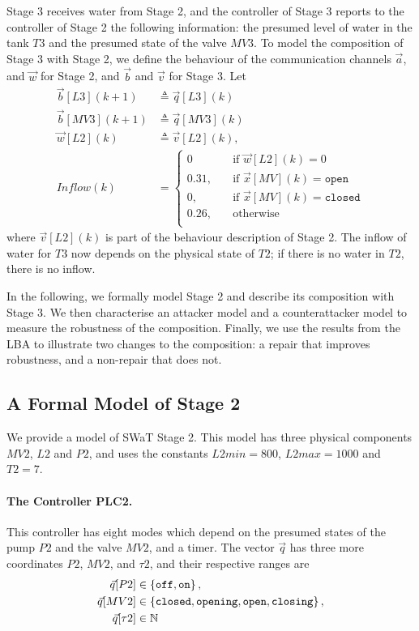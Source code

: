 {{Stage 3 receives water from Stage 2, and the controller of Stage 3 reports to the controller of Stage 2 the following information: the presumed level of water in the tank $T3$ and the presumed state of the valve $MV3$. To model the composition of Stage 3 with Stage 2, we define the behaviour of the communication channels $\vec{a}$, and $\vec{w}$ for Stage 2, and $\vec{b}$ and $\vec{v}$ for Stage 3. Let  
\begin{align}
  \vec{b}[L3](k+1)&\triangleq \vec{q}[L3](k)\\
  \vec{b}[MV3](k+1)&\triangleq \vec{q}[MV3](k)\\
  \vec{w}[L2](k)&\triangleq \vec{v}[L2](k),\\
  Inflow(k)&=\begin{cases}
    0 & \quad \text{if $\vec{w}[L2](k)=0$}\\
    0.31,&\quad \text{if $\vec{x}[MV](k)=\texttt{open}$}\\
    0,&\quad \text{if $\vec{x}[MV](k)=\texttt{closed}$}\\
    0.26,&\quad \text{otherwise}\\
  \end{cases}
\end{align}
where $\vec{v}[L2](k)$ is part of the behaviour description of Stage 2. The inflow of water for $T3$ now depends on the physical state of $T2$; if there is no water in $T2$, there is no inflow.

In the following, we formally model Stage 2 and describe its composition with Stage 3. We then characterise an attacker model and a counterattacker model to measure the robustness of the composition. Finally, we use the results from the LBA to illustrate two changes to the composition: a repair that improves robustness, and a non-repair that does not.

\subsection{A Formal Model of Stage 2}
We provide a model of SWaT Stage 2. This model has three physical components $MV2$, $L2$ and $P2$, and uses the constants $L2min=800$, $L2max=1000$ and $T2=7$.

\paragraph{The Controller PLC2.} 
This controller has eight modes which depend on the presumed states of the pump $P2$ and the valve $MV2$, and a timer. The vector $\vec{q}$ has three more coordinates $P2$, $MV2$, and $\tau2$, and their respective ranges are 
\begin{align*}
  \vec{q}[P2]&\in\left\{\texttt{off},\texttt{on}\right\},\\
  \vec{q}[MV2]&\in\left\{\texttt{closed},\texttt{opening},\texttt{open},\texttt{closing}\right\},\\
  \vec{q}[\tau2]&\in\mathbb{N}
\end{align*}

}}
